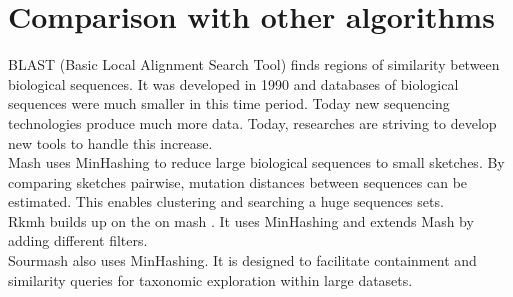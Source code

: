 \section{Comparison with other algorithms}


BLAST (Basic Local Alignment Search Tool) \cite{blast} finds regions of similarity between biological sequences. It was developed in 1990 and databases of biological sequences were much smaller in this time period. Today new sequencing technologies produce much more data. Today, researches are striving to develop new tools to handle this increase.\\

Mash \cite{mash} uses MinHashing to reduce large biological sequences to small sketches. By comparing sketches pairwise, mutation distances between sequences can be estimated. This enables clustering and searching a huge sequences sets.\\

Rkmh builds up on the on mash \cite{mash}. It uses MinHashing and extends Mash by adding different filters.\\

Sourmash \cite{sourmash} also uses MinHashing. It is designed to facilitate containment and similarity queries for taxonomic exploration within large datasets.\\
